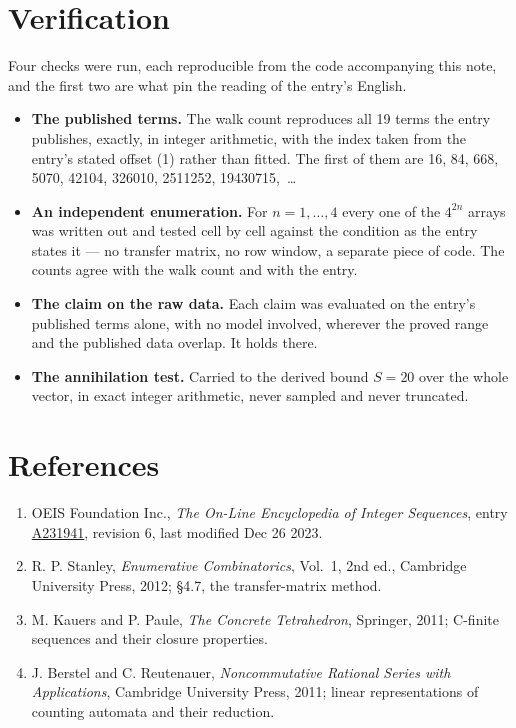 \documentclass[11pt]{article}
\theoremstyle{definition}
\begin{document}
\section{Verification}

Four checks were run, each reproducible from the code accompanying this note, and the first two are what pin the reading of the entry's English.

\begin{itemize}

\item {\bfseries The published terms.} The walk count reproduces all 19 terms the entry publishes, exactly, in integer arithmetic, with the index taken from the entry's stated offset (1) rather than fitted. The first of them are 16, 84, 668, 5070, 42104, 326010, 2511252, 19430715,~\dots

\item {\bfseries An independent enumeration.} For $n = 1,\dots,4$ every one of the $4^{2n}$ arrays was written out and tested cell by cell against the condition as the entry states it --- no transfer matrix, no row window, a separate piece of code. The counts agree with the walk count and with the entry.

\item {\bfseries The claim on the raw data.} Each claim was evaluated on the entry's published terms alone, with no model involved, wherever the proved range and the published data overlap. It holds there.

\item {\bfseries The annihilation test.} Carried to the derived bound $S = 20$ over the whole vector, in exact integer arithmetic, never sampled and never truncated.

\end{itemize}

\section{References}

\begin{enumerate}

\item OEIS Foundation Inc., \emph{The On-Line Encyclopedia of Integer Sequences}, entry \href{https://oeis.org/A231941}{A231941}, revision 6, last modified Dec 26 2023.

\item R. P. Stanley, \emph{Enumerative Combinatorics}, Vol.~1, 2nd ed., Cambridge University Press, 2012; \S4.7, the transfer-matrix method.

\item M. Kauers and P. Paule, \emph{The Concrete Tetrahedron}, Springer, 2011; C-finite sequences and their closure properties.

\item J. Berstel and C. Reutenauer, \emph{Noncommutative Rational Series with Applications}, Cambridge University Press, 2011; linear representations of counting automata and their reduction.

\end{enumerate}
\end{document}
